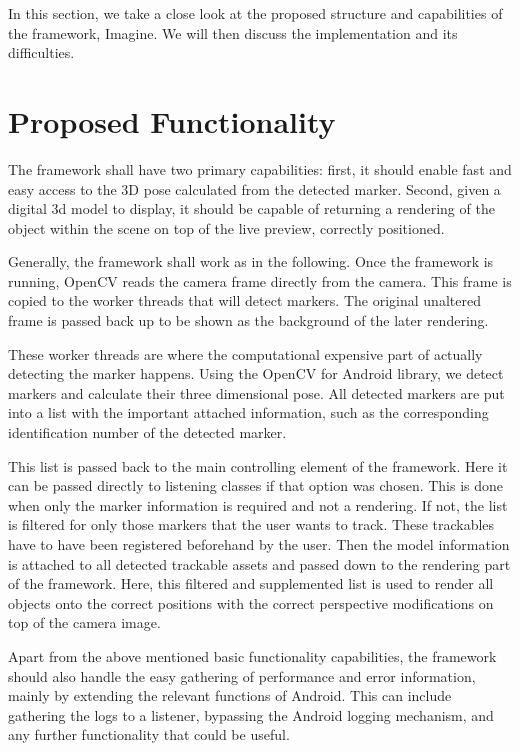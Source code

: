 
In this section, we take a close look at the proposed structure and capabilities of the framework, Imagine.
We will then discuss the implementation and its difficulties.

\section{Proposed Functionality}

The framework shall have two primary capabilities: first, it should enable fast and easy access to the 3D pose calculated from the detected marker.
Second, given a digital 3d model to display, it should be capable of returning a rendering of the object within the scene on top of the live preview, correctly positioned.

Generally, the framework shall work as in the following.
Once the framework is running, OpenCV reads the camera frame directly from the camera.
This frame is copied to the worker threads that will detect markers.
The original unaltered frame is passed back up to be shown as the background of the later rendering.

These worker threads are where the computational expensive part of actually detecting the marker happens.
Using the OpenCV for Android library, we detect markers and calculate their three dimensional pose.
All detected markers are put into a list with the important attached information, such as the corresponding identification number of the detected marker.

This list is passed back to the main controlling element of the framework.
Here it can be passed directly to listening classes if that option was chosen.
This is done when only the marker information is required and not a rendering.
If not, the list is filtered for only those markers that the user wants to track.
These trackables have to have been registered beforehand by the user.
Then the model information is attached to all detected trackable assets and passed down to the rendering part of the framework.
Here, this filtered and supplemented list is used to render all objects onto the correct positions with the correct perspective modifications on top of the camera image.

Apart from the above mentioned basic functionality capabilities, the framework should also handle the easy gathering of performance and error information, mainly by extending the relevant functions of Android.
This can include gathering the logs to a listener, bypassing the Android logging mechanism, and any further functionality that could be useful.

